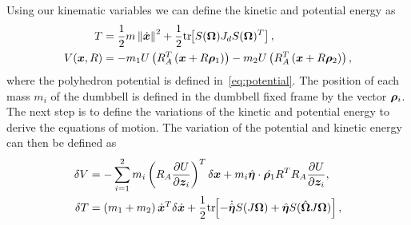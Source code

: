 \documentclass[letterpaper, paper,11pt]{AAS}		%
\begin{document}
Using our kinematic variables we can define the kinetic and potential energy as
\begin{align}\label{eq:kinetic_energy}
    T &= \frac{1}{2} m \left\| \dot{\bm{x}} \right\|^2 + \frac{1}{2} \mathrm{tr}\negthickspace\left[ S(\bm{\Omega}) J_d S(\bm{\Omega})^T \right] , \\
    V( \bm{x}, R ) &=  - m_1 U \left( R_A^T \left( \bm{x} + R \bm{\rho}_1 \right) \right) - m_2 U \left( R_A^T \left( \bm{x} + R \bm{\rho}_2 \right) \right) ,
\end{align}
where the polyhedron potential is defined in~\cref{eq:potential}.
The position of each mass \(m_i\) of the dumbbell is defined in the dumbbell fixed frame by the vector \(\bm{\rho}_i\). 
The next step is to define the variations of the kinetic and potential energy to derive the equations of motion.
The variation of the potential and kinetic energy can then be defined as
\begin{align} 
    \delta V &= -\sum_{i=1}^2  m_i \left( R_A \frac{\partial U}{\partial \bm{z}_i}  \right)^T \delta \bm{x} + m_i \hat{\bm{\eta}}\cdot \hat{\bm{\rho}_1} R^T R_A \frac{\partial U}{\partial \bm{z}_i}, \\
    \delta T &= \left( m_1 + m_2 \right) \dot{\bm{x}}^T \delta \dot{\bm{x}} + \frac{1}{2} \mathrm{tr}\negthickspace\left[  - \dot{\hat{\bm{\eta}}} S(J \bm{\Omega}) + \hat{\bm{\eta}} S(\hat{ \bm{\Omega}} J \bm{\Omega}) \right] , 
\end{align}
\end{document}
